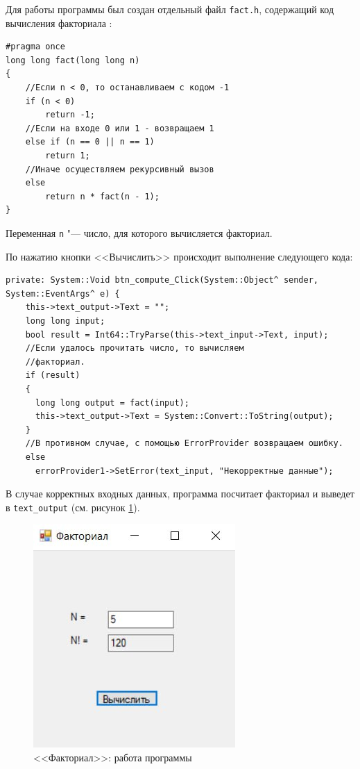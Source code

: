 Для работы программы был создан отдельный файл \verb"fact.h", содержащий   
код вычисления факториала \cite{book_excs}:
\begin{verbatim}
#pragma once
long long fact(long long n)
{
    //Если n < 0, то останавливаем с кодом -1
	if (n < 0)
		return -1;
    //Если на входе 0 или 1 - возвращаем 1
	else if (n == 0 || n == 1)
		return 1;
    //Иначе осуществляем рекурсивный вызов
	else 
		return n * fact(n - 1);
}
\end{verbatim}
Переменная \verb|n| "--- число, для которого вычисляется факториал.

По нажатию кнопки <<Вычислить>> происходит выполнение следующего кода:
\begin{verbatim}
private: System::Void btn_compute_Click(System::Object^ sender, System::EventArgs^ e) {
    this->text_output->Text = "";
    long long input;
    bool result = Int64::TryParse(this->text_input->Text, input);
    //Если удалось прочитать число, то вычисляем 
    //факториал.
    if (result)
    {
      long long output = fact(input);
      this->text_output->Text = System::Convert::ToString(output);
    }
    //В противном случае, с помощью ErrorProvider возвращаем ошибку.
    else
      errorProvider1->SetError(text_input, "Некорректные данные");
\end{verbatim}

В случае корректных входных данных, программа посчитает факториал и выведет в 
\verb|text_output| (см. рисунок \ref{fig:factorial_result}).
\begin{figure}[H]
    \centering
    \includegraphics{../img/factorial/factoral_result.png}
    \caption{<<Факториал>>: работа программы}
    \label{fig:factorial_result}
\end{figure}

